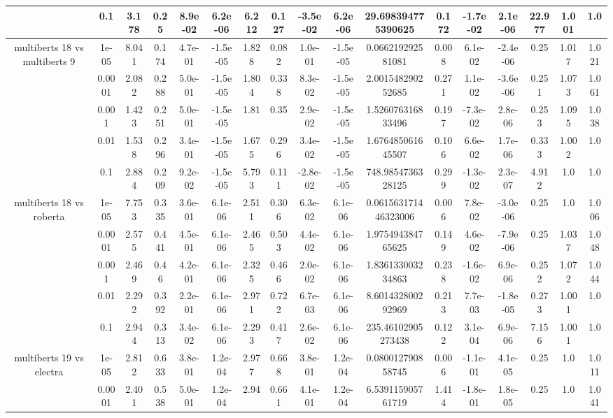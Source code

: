 \begin{tabular}{|c|c|c|c|c|c|c|c|c|c|c|c|c|c|c|c|c|}
 & 0.1 & 3.178 & 0.25 & 8.9e-02 & 6.2e-06 & 6.212 & 0.127 & -3.5e-02 & 6.2e-06 & 29.698394775390625 & 0.172 & -1.7e-02 & 2.1e-06 & 22.977 & 1.001 & 1.0 \\
\hline
\multirow{5}{*}{multiberts 18 vs multiberts 9} & 1e-05 & 8.041 & 0.174 & 4.7e-01 & -1.5e-05 & 1.828 & 0.082 & 1.0e-01 & -1.5e-05 & 0.066219292581081 & 0.008 & 6.1e-02 & -2.4e-06 & 0.25 & 1.017 & 1.021 \\
 & 0.0001 & 2.082 & 0.288 & 5.0e-01 & -1.5e-05 & 1.804 & 0.338 & 8.3e-02 & -1.5e-05 & 2.001548290252685 & 0.271 & 1.1e-02 & -3.6e-06 & 0.251 & 1.073 & 1.061 \\
 & 0.001 & 1.423 & 0.251 & 5.0e-01 & -1.5e-05 & 1.81 & 0.35 & 2.9e-02 & -1.5e-05 & 1.526076316833496 & 0.197 & -7.3e-02 & 2.8e-06 & 0.253 & 1.095 & 1.038 \\
 & 0.01 & 1.538 & 0.296 & 3.4e-01 & -1.5e-05 & 1.675 & 0.296 & 3.4e-02 & -1.5e-05 & 1.676485061645507 & 0.106 & 6.6e-02 & 1.7e-06 & 0.333 & 1.002 & 1.0 \\
 & 0.1 & 2.884 & 0.209 & 9.2e-02 & -1.5e-05 & 5.793 & 0.111 & -2.8e-02 & -1.5e-05 & 748.9854736328125 & 0.299 & -1.3e-02 & 2.3e-07 & 4.912 & 1.0 & 1.0 \\
\hline
\multirow{5}{*}{multiberts 18 vs roberta } & 1e-05 & 7.753 & 0.335 & 3.6e-01 & 6.1e-06 & 2.511 & 0.306 & 6.3e-02 & 6.1e-06 & 0.061563171446323006 & 0.006 & 7.8e-02 & -3.0e-06 & 0.25 & 1.0 & 1.006 \\
 & 0.0001 & 2.575 & 0.441 & 4.5e-01 & 6.1e-06 & 2.465 & 0.503 & 4.4e-02 & 6.1e-06 & 1.975494384765625 & 0.149 & 4.6e-02 & -7.9e-06 & 0.25 & 1.037 & 1.048 \\
 & 0.001 & 2.469 & 0.46 & 4.2e-01 & 6.1e-06 & 2.325 & 0.466 & 2.0e-02 & 6.1e-06 & 1.836133003234863 & 0.238 & -1.6e-02 & 6.9e-06 & 0.252 & 1.072 & 1.044 \\
 & 0.01 & 2.292 & 0.392 & 2.2e-01 & 6.1e-06 & 2.971 & 0.722 & 6.7e-03 & 6.1e-06 & 8.601432800292969 & 0.213 & 7.7e-03 & -1.8e-05 & 0.273 & 1.001 & 1.0 \\
 & 0.1 & 2.944 & 0.313 & 3.4e-02 & 6.1e-06 & 2.293 & 0.417 & 2.6e-02 & 6.1e-06 & 235.46102905273438 & 0.122 & 3.1e-04 & 6.9e-06 & 7.156 & 1.001 & 1.0 \\
\hline
\multirow{5}{*}{multiberts 19 vs electra } & 1e-05 & 2.812 & 0.633 & 3.8e-01 & 1.2e-04 & 2.977 & 0.668 & 3.8e-01 & 1.2e-04 & 0.080012790858745 & 0.006 & -1.1e-01 & 4.1e-05 & 0.25 & 1.0 & 1.011 \\
 & 0.0001 & 2.401 & 0.538 & 5.0e-01 & 1.2e-04 & 2.94 & 0.661 & 4.1e-01 & 1.2e-04 & 6.539115905761719 & 1.414 & -1.8e-01 & 1.8e-05 & 0.25 & 1.0 & 1.041 \\

\end{tabular}
